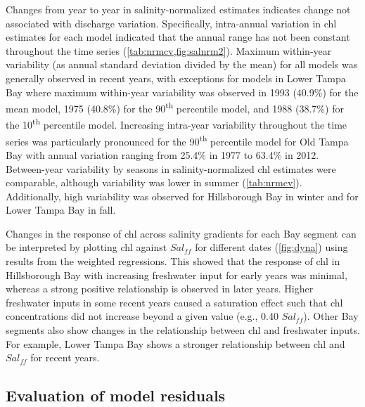 \documentclass{svjour3}\usepackage[]{graphicx}\usepackage[]{color}
\newcommand{\nine}{90\textsuperscript{th} percentile }
\newcommand{\ten}{10\textsuperscript{th} percentile }
\begin{document}
Changes from year to year in salinity-normalized estimates indicates change not associated with discharge variation.  Specifically, intra-annual variation in \ac{chl} estimates for each model indicated that the annual range has not been constant throughout the time series (\cref{tab:nrmcv,fig:salnrm2}).  Maximum within-year variability (as annual standard deviation divided by the mean) for all models was generally observed in recent years, with exceptions for models in Lower Tampa Bay where maximum within-year variability was observed in 1993 (40.9\%) for the mean model, 1975 (40.8\%) for the \nine model, and 1988 (38.7\%) for the \ten model.  Increasing intra-year variability throughout the time series was particularly pronounced for the \nine model for Old Tampa Bay with annual variation ranging from 25.4\% in 1977  to 63.4\% in 2012.  Between-year variability by seasons in salinity-normalized \ac{chl} estimates were comparable, although variability was lower in summer (\cref{tab:nrmcv}).  Additionally, high variability was observed for Hillsborough Bay in winter and for Lower Tampa Bay in fall.

Changes in the response of \ac{chl} across salinity gradients for each Bay segment can be interpreted by plotting \ac{chl} against $Sal_{ff}$ for different dates (\cref{fig:dyna}) using results from the weighted regressions.  This showed that the response of \ac{chl} in Hillsborough Bay with increasing freshwater input for early years was minimal, whereas a strong positive relationship is observed in later years.  Higher freshwater inputs in some recent years caused a saturation effect such that \ac{chl} concentrations did not increase beyond a given value (e.g., 0.40 $Sal_{ff}$).  Other Bay segments also show changes in the relationship between \ac{chl} and freshwater inputs.  For example, Lower Tampa Bay shows a stronger relationship between \ac{chl} and $Sal_{ff}$ for recent years. 

\subsection{Evaluation of model residuals}
\end{document}
